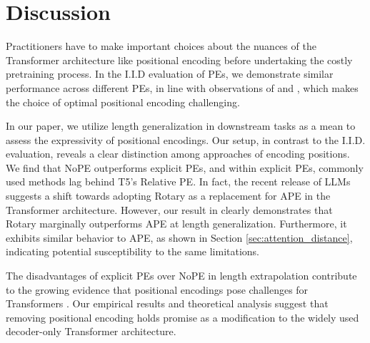 \documentclass{article}
\begin{document}
\section{Discussion}
\label{sec:discussion}

Practitioners have to make important choices about the nuances of the Transformer architecture like positional encoding before undertaking the costly pretraining process.
In the I.I.D evaluation of PEs, we demonstrate similar performance across different PEs, in line with observations of \citet{Haviv2022:NoPETransformer} and \citet{Scao2022:LMinOneMillionGPUHours}, which makes the choice of optimal positional encoding challenging.

In our paper, we utilize length generalization in downstream tasks as a mean to assess the expressivity of positional encodings.
Our setup, in contrast to the I.I.D. evaluation, reveals a clear distinction among approaches of encoding positions.
We find that NoPE outperforms explicit PEs, and within explicit PEs, commonly used methods lag behind T5's Relative PE.
In fact, the recent release of LLMs \citep{Touvron2023:LLaMA,Chowdhery2022:PaLM} suggests a shift towards adopting Rotary as a replacement for APE in the Transformer architecture.
However, our result in  clearly demonstrates that Rotary marginally outperforms APE at length generalization. Furthermore, it exhibits similar behavior to APE, as shown in Section \ref{sec:attention_distance}, indicating potential susceptibility to the same limitations.

The disadvantages of explicit PEs over NoPE in length extrapolation contribute to the growing evidence that positional encodings pose challenges for Transformers \citep{Sinha2022:CuriousCaseAPE,Luo2021:PositionalArtefacts}. Our empirical results and theoretical analysis suggest that removing positional encoding holds promise as a modification to the widely used decoder-only Transformer architecture.
\end{document}

